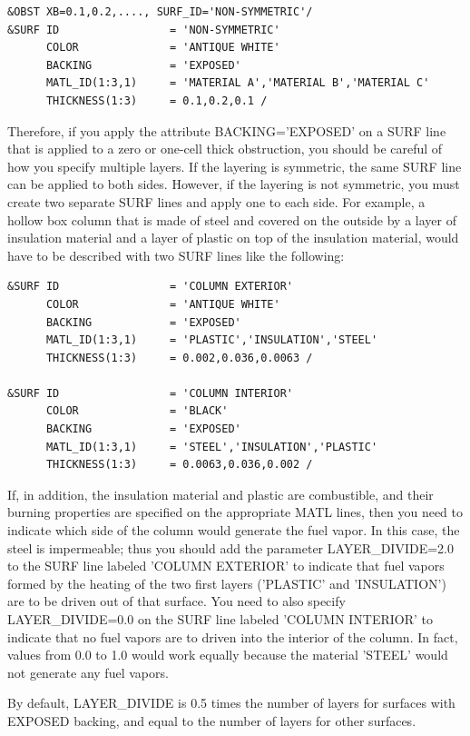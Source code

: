 \documentclass[11pt]{book}
\begin{document}
\begin{lstlisting}
&OBST XB=0.1,0.2,...., SURF_ID='NON-SYMMETRIC'/
&SURF ID                 = 'NON-SYMMETRIC'
      COLOR              = 'ANTIQUE WHITE'
      BACKING            = 'EXPOSED'
      MATL_ID(1:3,1)     = 'MATERIAL A','MATERIAL B','MATERIAL C'
      THICKNESS(1:3)     = 0.1,0.2,0.1 /
\end{lstlisting}

Therefore, if you apply the attribute {\ct BACKING='EXPOSED'} on a {\ct SURF} line that is applied to a zero or one-cell thick
obstruction, you should be careful of how you specify multiple layers. If the layering is symmetric, the same {\ct SURF} line can
be applied to both sides. However, if the layering is not symmetric, you must create two separate {\ct SURF} lines and apply
one to each side. For example, a hollow box column that is made of steel and covered on the outside by a layer of insulation
material and a layer of plastic on top of the insulation material, would have to be described with two {\ct SURF} lines like the following:
\begin{lstlisting}
&SURF ID                 = 'COLUMN EXTERIOR'
      COLOR              = 'ANTIQUE WHITE'
      BACKING            = 'EXPOSED'
      MATL_ID(1:3,1)     = 'PLASTIC','INSULATION','STEEL'
      THICKNESS(1:3)     = 0.002,0.036,0.0063 /

&SURF ID                 = 'COLUMN INTERIOR'
      COLOR              = 'BLACK'
      BACKING            = 'EXPOSED'
      MATL_ID(1:3,1)     = 'STEEL','INSULATION','PLASTIC'
      THICKNESS(1:3)     = 0.0063,0.036,0.002 /
\end{lstlisting}
If, in addition, the insulation material and plastic are combustible, and their burning properties are specified on the appropriate {\ct MATL} lines,
then you need to indicate which side of the column would generate the fuel vapor. In this case, the steel is impermeable; thus you should add the parameter
{\ct LAYER\_DIVIDE=2.0} to the {\ct SURF} line labeled {\ct 'COLUMN EXTERIOR'} to indicate that fuel vapors formed by the heating of the
two first layers ({\ct 'PLASTIC'} and {\ct 'INSULATION'}) are to be driven out of that surface.
You need to also specify {\ct LAYER\_DIVIDE=0.0} on the {\ct SURF} line labeled {\ct 'COLUMN INTERIOR'} to indicate that no fuel
vapors are to driven into the interior of the column. In fact, values from 0.0 to 1.0 would work equally because the material
{\ct 'STEEL'} would not generate any fuel vapors.

By default, {\ct LAYER\_DIVIDE} is 0.5 times the number of layers for surfaces with {\ct EXPOSED} backing, and equal to the number of
layers for other surfaces.
\end{document}
